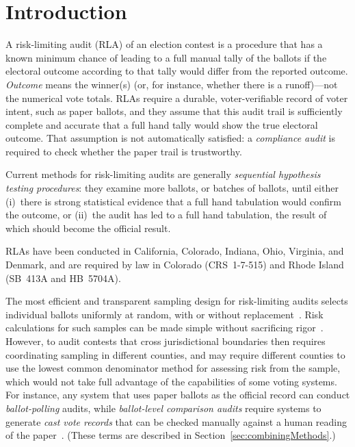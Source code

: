\documentclass[runningheads]{llncs}
\begin{document}
\section{Introduction}
A risk-limiting audit (RLA) of an election contest is a procedure that
has a known minimum chance of leading to a full manual tally of the ballots if the electoral outcome  according to that tally would differ from the reported outcome.
\emph{Outcome} means the winner(s) (or, for instance, whether there is a runoff)---not the numerical vote totals. 
RLAs require a durable, voter-verifiable record of voter intent, such as paper ballots,
and they assume that this audit trail is sufficiently complete and accurate that a full hand
tally would show the true electoral outcome.
That assumption is not automatically satisfied: a \emph{compliance audit}
\cite{starkWagner12} 
is required to check whether the paper trail is trustworthy.

Current methods for risk-limiting audits are generally \emph{sequential hypothesis testing procedures}: they examine more ballots, or batches of ballots,
until either (i)~there is strong statistical evidence that a full hand tabulation would confirm the outcome,
or (ii)~the audit has led to a full hand tabulation, the result of which should become the official
result.

RLAs have been conducted in California, Colorado, Indiana, Ohio, Virginia, and Denmark, and are required by law in Colorado (CRS~1-7-515) and Rhode Island (SB~413A and HB~5704A).

The most efficient and transparent sampling design for risk-limiting audits selects individual ballots uniformly at random, with or without replacement~\cite{stark10c}.
Risk calculations for such samples can be made simple without sacrificing rigor~\cite{stark10d,lindemanStark12}.
However, to audit contests that cross jurisdictional boundaries then requires coordinating sampling in different counties, and may require different counties to use the lowest common denominator method for assessing risk from the sample, which would not take full advantage of the capabilities of some voting systems. 
For instance, any system that uses paper ballots as the official record can conduct \emph{ballot-polling} audits, while \emph{ballot-level comparison audits} require systems to generate \emph{cast vote records} that can be checked manually against a human reading of the paper~\cite{lindemanEtal12,lindemanStark12}. 
(These terms are described in Section~\ref{sec:combiningMethods}.) 
\end{document}
